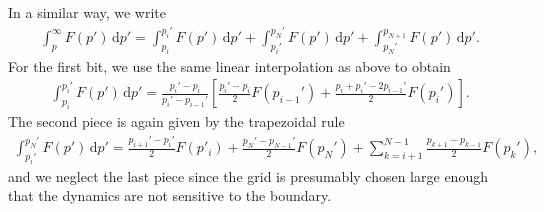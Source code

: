\documentclass[11pt,a4paper]{article}
\newcommand{\rd}{\ensuremath{\mathrm{d}}}
\begin{document}
In a similar way, we write
\begin{align}
\int_p^\infty F(p') \, \rd p' = \int_{p_i}^{p_i'} F(p') \, \rd p' + \int_{p_i'}^{p_N'} F(p')\,\rd p' + \int_{p_N'}^{p_{N+1}}F(p') \,\rd p'.
\end{align}
For the first bit, we use the same linear interpolation as above to obtain
\begin{align}
 \int_{p_i}^{p_i'} F(p') \, \rd p' = \frac{p_i'-p_i}{p_i'-p_{i-1}'}\left[\frac{p_i'-p_i}{2}F(p_{i-1}')+\frac{p_i+p_i'-2p_{i-1}'}{2}F(p_i') \right].
\end{align}
The second piece is again given by the trapezoidal rule
\begin{align}
\int_{p_i'}^{p_N'} F(p')\,\rd p' =  \frac{p_{i+1}'-p_i'}{2}F(p'_i) + \frac{p_N'-p_{N-1}'}{2}F(p_N') + \sum_{k=i+1}^{N-1}\frac{p_{k+1}-p_{k-1}}{2}F(p_k'),
\end{align}
and we neglect the last piece since the grid is presumably chosen large enough that the dynamics are not sensitive to the boundary.


\end{document}
